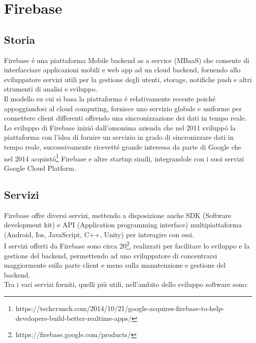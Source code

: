 \chapter{Firebase}                %
\lhead[\fancyplain{}{\bfseries\thepage}]{\fancyplain{}{\bfseries\rightmark}}
\section{Storia}                 %


Firebase \'e una piattaforma Mobile backend as a service (MBaaS) che consente
di interfacciare applicazioni mobili e web app ad un cloud backend, fornendo allo sviluppatore servizi utili per la gestione degli utenti, storage, notifiche push e altri strumenti di analisi e sviluppo.\\
Il modello su cui si basa la piattaforma \'e relativamente recente poich\'e appoggiandosi al cloud computing, fornisce uno servizio globale e uniforme per connettere client differenti offrendo una sincronizzazione dei dati in tempo reale.\\
Lo sviluppo di Firebase inizi\'o dall'omonima azienda che nel 2011 svilupp\'o la piattaforma con l'idea di fornire un servizio in grado di sincronizzare dati in tempo reale, successivamente ricevett\'e grande interessa da parte di Google che nel 2014 acquist\'o\footnote{https://techcrunch.com/2014/10/21/google-acquires-firebase-to-help-developers-build-better-realtime-apps/} Firebase e altre startup simili, integrandole con i suoi servizi Google Cloud Platform.






\section{Servizi}                 %
Firebase offre diversi servizi, mettendo a disposizione anche SDK (Software development kit) e API (Application programming interface) multipiattaforma (Android, Ios, JavaScript, C++, Unity) per interagire con essi.\\
I servizi offerti da Firebase sono circa 20\footnote{https://firebase.google.com/products/}, realizzati per facilitare lo sviluppo e la gestione del backend, permettendo ad uno sviluppatore di concentrarsi maggiormente sulla parte client e meno sulla manutenzione e gestione del backend.\\
Tra i vari servizi forniti, quelli pi\'u utili, nell'ambito dello sviluppo software sono:


